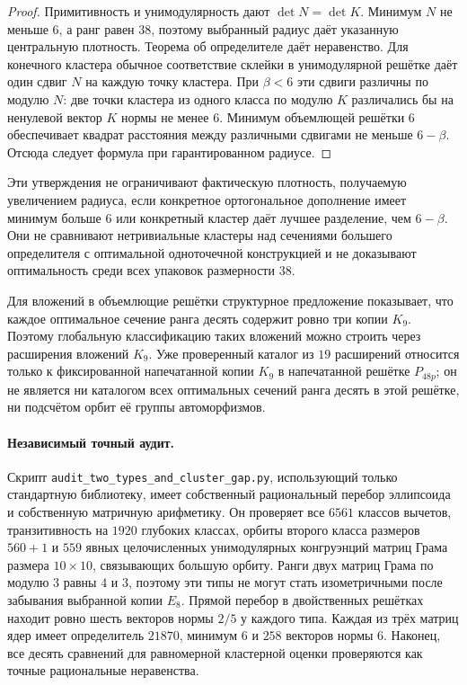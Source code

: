 \begin{proof}
Примитивность и унимодулярность дают $\det N=\det K$.
Минимум $N$ не меньше $6$, а ранг равен $38$, поэтому выбранный радиус
даёт указанную центральную плотность. Теорема об определителе даёт
неравенство. Для конечного кластера обычное соответствие склейки
в унимодулярной решётке даёт один сдвиг $N$ на каждую точку кластера.
При $\beta<6$ эти сдвиги различны по модулю $N$: две точки кластера
из одного класса по модулю $K$ различались бы на ненулевой вектор $K$
нормы не менее $6$. Минимум объемлющей решётки $6$ обеспечивает
квадрат расстояния между различными сдвигами не меньше $6-\beta$.
Отсюда следует формула при гарантированном радиусе.
\end{proof}

Эти утверждения не ограничивают фактическую плотность, получаемую
увеличением радиуса, если конкретное ортогональное дополнение имеет
минимум больше $6$ или конкретный кластер даёт лучшее разделение,
чем $6-\beta$. Они не сравнивают нетривиальные кластеры над сечениями
большего определителя с оптимальной одноточечной конструкцией
и не доказывают оптимальность среди всех упаковок размерности $38$.

Для вложений в объемлющие решётки структурное предложение показывает,
что каждое оптимальное сечение ранга десять содержит ровно три копии
$K_9$. Поэтому глобальную классификацию таких вложений можно строить
через расширения вложений $K_9$. Уже проверенный каталог из $19$
расширений относится только к фиксированной напечатанной копии
$K_9$ в напечатанной решётке $P_{48p}$; он не является ни каталогом
всех оптимальных сечений ранга десять в этой решётке, ни подсчётом
орбит её группы автоморфизмов.

\paragraph{Независимый точный аудит.}
Скрипт \texttt{audit\_two\_types\_and\_cluster\_gap.py}, использующий
только стандартную библиотеку, имеет собственный рациональный перебор
эллипсоида и собственную матричную арифметику. Он проверяет все $6561$
классов вычетов, транзитивность на $1920$ глубоких классах, орбиты
второго класса размеров $560+1$ и $559$ явных целочисленных
унимодулярных конгруэнций матриц Грама размера $10\times10$, связывающих
большую орбиту. Ранги двух матриц Грама по модулю $3$ равны $4$ и $3$,
поэтому эти типы не могут стать изометричными после забывания выбранной
копии $E_8$. Прямой перебор в двойственных решётках находит ровно шесть
векторов нормы $2/5$ у каждого типа. Каждая из трёх матриц ядер имеет
определитель $21870$, минимум $6$ и $258$ векторов нормы $6$.
Наконец, все десять сравнений для равномерной кластерной оценки
проверяются как точные рациональные неравенства.
